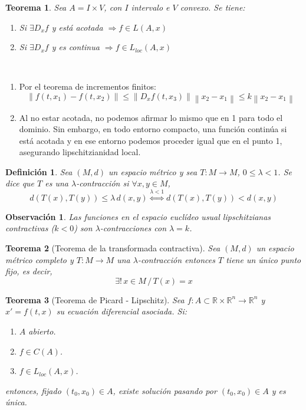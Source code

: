 \documentclass[11pt]{article}
\makeatletter
\newcommand{\iindex}[1]{\emph{#1}\index{#1}}
\theoremstyle{theorem-style}  %
\newtheorem{theorem}{Teorema}[section]  %
\renewenvironment{proof}[1][\proofname]{\par
	\pushQED{\qed}%
	\normalfont \topsep6\p@\@plus6\p@\relax
	\list{}{%
		\settowidth{\leftmargin}{\quad:\hskip\labelsep}%
		\setlength{\labelwidth}{0pt}%
		\setlength{\itemindent}{-\leftmargin}%
	}%
	\item[\hskip\labelsep\itshape#1\@addpunct{:}]\ignorespaces
}{%
	\popQED\endlist\@endpefalse
}
\theoremstyle{definition-style}
\newtheorem{definition}{Definición}[section]
\newtheorem*{observation}{Observación} %
\theoremstyle{example-style}
\providecommand{\norm}[1]{\left\lVert#1\right\rVert} %
\makeatother
\begin{document}
\begin{theorem}\label{lloc_suf}
	Sea $A = I \times V$, con $I$ intervalo e $V$ convexo. Se tiene:
	\begin{enumerate}
		\item Si $\exists D_x f$ y está acotada $\Rightarrow f \in L(A, x)$
		\item Si $\exists D_x f$ y es continua $\Rightarrow f \in L_{loc}(A, x)$
	\end{enumerate}
\end{theorem}
\begin{proof}\ 
	\begin{enumerate}
		\item Por el teorema de incrementos finitos:
		\[\norm{f(t, x_1) - f(t, x_2)} \leq \norm{D_xf(t, x_3)} \norm{x_2 - x_1} \leq k\norm{x_2 - x_1}\]
		\item Al no estar acotada, no podemos afirmar lo mismo que en 1 para todo el dominio. Sin embargo, en todo entorno compacto, una función continúa si está acotada y en ese entorno podemos proceder igual que en el punto 1, asegurando lipschitzianidad local.
	\end{enumerate}
\end{proof}
\begin{definition}
	Sea $(M, d)$ un espacio métrico y sea $T: M \longrightarrow M$, $0 \leq \lambda < 1$. Se dice que $T$ es una \iindex{$\lambda$-contracción} si $\forall x, y \in M$, 
	\[d(T(x), T(y)) \leq \lambda \, d(x, y) \stackrel{\lambda < 1}{\Leftrightarrow} d(T(x), T(y)) < d(x, y)\]
\end{definition}
\begin{observation}
	Las funciones en el espacio euclídeo usual lipschitzianas contractivas ($ k<0 $) son $\lambda$-contracciones con $ \lambda=k $.
\end{observation}
\begin{theorem}[Teorema de la transformada contractiva]\label{transformada}
	Sea $(M, d)$ un espacio métrico completo y $T: M \longrightarrow M$ una $\lambda$-contracción entonces $T$ tiene un único punto fijo, es decir,
	\[\exists! \, x \in M \,/\, T(x) = x\]
\end{theorem}
\begin{theorem}[Teorema de Picard - Lipschitz] \label{picard}
	Sea $f : A \subset \mathbb{R} \times \mathbb{R}^n \longrightarrow \mathbb{R}^n$ y $x' = f(t, x)$ su ecuación diferencial asociada. Si:
	\begin{enumerate}[\quad i)]
		\item $A$ abierto.
		\item $f \in C(A)$.
		\item $f \in L_{loc} (A, x)$.
	\end{enumerate}
	entonces, fijado $(t_0, x_0) \in A$, existe solución pasando por $(t_0, x_0) \in A$ y es única.
\end{theorem}
\end{document}
